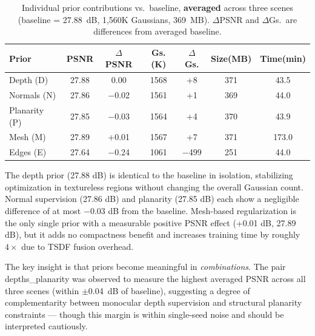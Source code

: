 \begin{table}[h]
\centering
\small
\caption{Individual prior contributions vs.\ baseline, \textbf{averaged} across three scenes (baseline = 27.88~dB, 1{,}560K Gaussians, 369~MB). $\Delta$PSNR and $\Delta$Gs.\ are differences from averaged baseline.}
\label{tab:individual_priors}
\begin{tabular}{l|cccc|cc}
\toprule
\textbf{Prior} & \textbf{PSNR} & \textbf{$\Delta$PSNR} & \textbf{Gs.(K)} & \textbf{$\Delta$Gs.} & \textbf{Size(MB)} & \textbf{Time(min)} \\
\midrule
Depth (D)     & \cellcolor{green!40}27.88 & \cellcolor{green!40}0.00  & 1568 & +8   & 371 & \cellcolor{green!70}43.5 \\
Normals (N)   & \cellcolor{green!20}27.86 & $-$0.02 & \cellcolor{green!40}1561 & \cellcolor{green!40}+1   & \cellcolor{green!40}369 & \cellcolor{green!20}44.0 \\
Planarity (P) & 27.85 & $-$0.03 & 1564 & \cellcolor{green!20}+4   & \cellcolor{green!20}370 & \cellcolor{green!40}43.9 \\
Mesh (M)      & \cellcolor{green!70}27.89 & \cellcolor{green!70}+0.01 & 1567 & +7   & 371 & 173.0 \\
Edges (E)     & 27.64 & $-$0.24 & \cellcolor{green!70}1061 & \cellcolor{green!70}$-$499 & \cellcolor{green!70}251 & \cellcolor{green!20}44.0 \\
\bottomrule
\end{tabular}
\end{table}

The depth prior (27.88 dB) is identical to the baseline in isolation, stabilizing optimization in textureless regions without changing the overall Gaussian count. Normal supervision (27.86 dB) and planarity (27.85 dB) each show a negligible difference of at most $-0.03$ dB from the baseline. Mesh-based regularization is the only single prior with a measurable positive PSNR effect (+0.01 dB, 27.89 dB), but it adds no compactness benefit and increases training time by roughly $4\times$ due to TSDF fusion overhead.

The key insight is that priors become meaningful in \emph{combinations}. The pair depths\_\allowbreak planarity was observed to measure the highest averaged PSNR across all three scenes (within $\pm$0.04~dB of baseline), suggesting a degree of complementarity between monocular depth supervision and structural planarity constraints — though this margin is within single-seed noise and should be interpreted cautiously.

